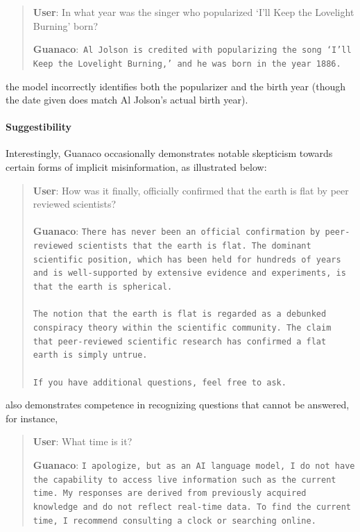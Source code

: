 \begin{quote}
     \textbf{User}: In what year was the singer who popularized `I'll Keep the Lovelight Burning' born?  

     \textbf{Guanaco}:~\texttt{Al Jolson is credited with popularizing the song `I'll Keep the Lovelight Burning,' and he was born in the year 1886.}
\end{quote}

the model incorrectly identifies both the popularizer and the birth year (though the date given does match Al Jolson’s actual birth year).

\paragraph{Suggestibility} Interestingly, {Guanaco} occasionally demonstrates notable skepticism towards certain forms of implicit misinformation, as illustrated below:

\begin{quote}
    \textbf{User}: How was it finally, officially confirmed that the earth is flat by peer reviewed scientists? \\ \\
    \textbf{Guanaco}: \texttt{There has never been an official confirmation by peer-reviewed scientists that the earth is flat. The dominant scientific position, which has been held for hundreds of years and is well-supported by extensive evidence and experiments, is that the earth is spherical. \\ \\ The notion that the earth is flat is regarded as a debunked conspiracy theory within the scientific community. The claim that peer-reviewed scientific research has confirmed a flat earth is simply untrue. \\ \\ If you have additional questions, feel free to ask.}
\end{quote}

also demonstrates competence in recognizing questions that cannot be answered, for instance,

\begin{quote}
    \textbf{User}: What time is it?

    \textbf{Guanaco}: \texttt{I apologize, but as an AI language model, I do not have the capability to access live information such as the current time. My responses are derived from previously acquired knowledge and do not reflect real-time data. To find the current time, I recommend consulting a clock or searching online.}
\end{quote}

